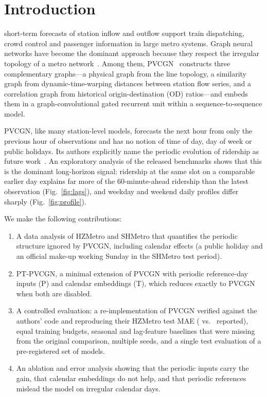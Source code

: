 \documentclass[journal]{IEEEtran}
\begin{document}
\section{Introduction}
 short-term forecasts of station inflow and outflow support train dispatching, crowd control and passenger information in large metro systems. Graph neural networks have become the dominant approach because they respect the irregular topology of a metro network~\cite{li2018dcrnn,wu2019graphwavenet}. Among them, PVCGN~\cite{liu2022pvcgn} constructs three complementary graphs---a physical graph from the line topology, a similarity graph from dynamic-time-warping distances between station flow series, and a correlation graph from historical origin-destination (OD) ratios---and embeds them in a graph-convolutional gated recurrent unit within a sequence-to-sequence model.

PVCGN, like many station-level models, forecasts the next hour from only the previous hour of observations and has no notion of time of day, day of week or public holidays. Its authors explicitly name the periodic evolution of ridership as future work~\cite{liu2022pvcgn}. An exploratory analysis of the released benchmarks shows that this is the dominant long-horizon signal: ridership at the same slot on a comparable earlier day explains far more of the 60-minute-ahead ridership than the latest observation (Fig.~\ref{fig:lags}), and weekday and weekend daily profiles differ sharply (Fig.~\ref{fig:profile}).

We make the following contributions:
\begin{enumerate}
\item A data analysis of HZMetro and SHMetro that quantifies the periodic structure ignored by PVCGN, including calendar effects (a public holiday and an official make-up working Sunday in the SHMetro test period).
\item PT-PVCGN, a minimal extension of PVCGN with periodic reference-day inputs (P) and calendar embeddings (T), which reduces exactly to PVCGN when both are disabled.
\item A controlled evaluation: a re-implementation of PVCGN verified against the authors' code and reproducing their HZMetro test MAE (\hzPV{} vs.\ \hzPVpaper{} reported), equal training budgets, seasonal and lag-feature baselines that were missing from the original comparison, multiple seeds, and a single test evaluation of a pre-registered set of models.
\item An ablation and error analysis showing that the periodic inputs carry the gain, that calendar embeddings do not help, and that periodic references mislead the model on irregular calendar days.
\end{enumerate}
\end{document}
